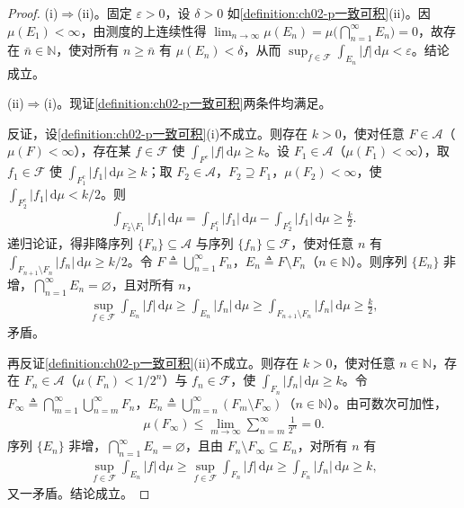 \documentclass[../../main.tex]{subfiles}%
\begin{document}
\begin{proof}
(i)$\Rightarrow$(ii)。固定 $\varepsilon>0$，设 $\delta>0$ 如\cref{definition:ch02-p一致可积}(ii)。因 $\mu(E_1)<\infty$，由测度的上连续性得 $\lim_{n\to\infty}\mu(E_n)=\mu\bigl(\bigcap_{n=1}^\infty E_n\bigr)=0$，故存在 $\bar n\in\mathbb N$，使对所有 $n\geqslant\bar n$ 有 $\mu(E_n)<\delta$，从而 $\sup_{f\in\mathscr F}\int_{E_n}|f|\,\mathrm{d}\mu<\varepsilon$。结论成立。

(ii)$\Rightarrow$(i)。现证\cref{definition:ch02-p一致可积}两条件均满足。

反证，设\cref{definition:ch02-p一致可积}(i)不成立。则存在 $k>0$，使对任意 $F\in\mathscr A$（$\mu(F)<\infty$），存在某 $f\in\mathscr F$ 使 $\int_{F^c}|f|\,\mathrm{d}\mu\geqslant k$。设 $F_1\in\mathscr A$（$\mu(F_1)<\infty$），取 $f_1\in\mathscr F$ 使 $\int_{F_1^c}|f_1|\,\mathrm{d}\mu\geqslant k$；取 $F_2\in\mathscr A$，$F_2\supseteq F_1$，$\mu(F_2)<\infty$，使 $\int_{F_2^c}|f_1|\,\mathrm{d}\mu<k/2$。则
\begin{align*}
\int_{F_2\setminus F_1}|f_1|\,\mathrm{d}\mu=\int_{F_1^c}|f_1|\,\mathrm{d}\mu-\int_{F_2^c}|f_1|\,\mathrm{d}\mu\geqslant\frac k2.
\end{align*}
递归论证，得非降序列 $\{F_n\}\subseteq\mathscr A$ 与序列 $\{f_n\}\subseteq\mathscr F$，使对任意 $n$ 有 $\int_{F_{n+1}\setminus F_n}|f_n|\,\mathrm{d}\mu\geqslant k/2$。令 $F\triangleq \bigcup_{n=1}^\infty F_n$，$E_n\triangleq F\setminus F_n$（$n\in\mathbb N$）。则序列 $\{E_n\}$ 非增，$\bigcap_{n=1}^\infty E_n=\varnothing $，且对所有 $n$，
\begin{align*}
\sup_{f\in\mathscr F}\int_{E_n}|f|\,\mathrm{d}\mu\geqslant\int_{E_n}|f_n|\,\mathrm{d}\mu
\geqslant\int_{F_{n+1}\setminus F_n}|f_n|\,\mathrm{d}\mu\geqslant\frac k2,
\end{align*}
矛盾。

再反证\cref{definition:ch02-p一致可积}(ii)不成立。则存在 $k>0$，使对任意 $n\in\mathbb N$，存在 $F_n\in\mathscr A$（$\mu(F_n)<1/2^n$）与 $f_n\in\mathscr F$，使 $\int_{F_n}|f_n|\,\mathrm{d}\mu\geqslant k$。令 $F_\infty\triangleq \bigcap_{m=1}^\infty\bigcup_{n=m}^\infty F_n$，$E_n\triangleq \bigcup_{m=n}^\infty(F_m\setminus F_\infty)$（$n\in\mathbb N$）。由可数次可加性，
\begin{align*}
\mu(F_\infty)\leqslant\lim_{m\to\infty}\sum_{n=m}^\infty\frac1{2^n}=0.
\end{align*}
序列 $\{E_n\}$ 非增，$\bigcap_{n=1}^\infty E_n=\varnothing $，且由 $F_n\setminus F_\infty\subseteq E_n$，对所有 $n$ 有
\begin{align*}
\sup_{f\in\mathscr F}\int_{E_n}|f|\,\mathrm{d}\mu
\geqslant\sup_{f\in\mathscr F}\int_{F_n}|f|\,\mathrm{d}\mu
\geqslant\int_{F_n}|f_n|\,\mathrm{d}\mu\geqslant k,
\end{align*}
又一矛盾。结论成立。
\end{proof}
\end{document}
